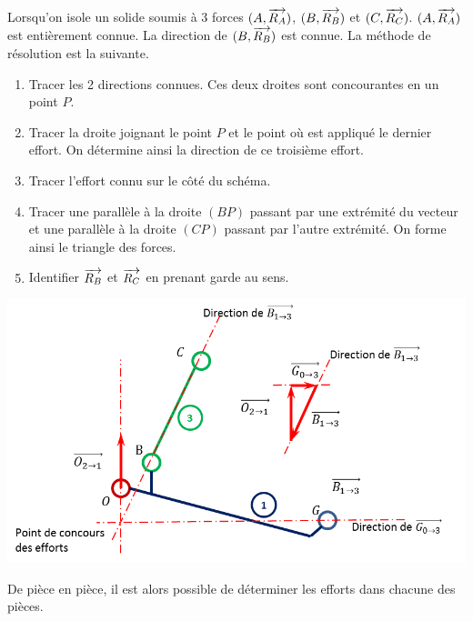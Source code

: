 \documentclass[10pt]{article}
\begin{document}
\begin{methode}
Lorsqu'on isole un solide soumis à 3 forces $(A,\overrightarrow{R_A})$, $(B,\overrightarrow{R_B})$ et $(C,\overrightarrow{R_C})$. $(A,\overrightarrow{R_A})$ est entièrement connue. La direction de $(B,\overrightarrow{R_B})$ est connue. La méthode de résolution est la suivante.
\begin{enumerate}
\item Tracer les 2 directions connues. Ces deux droites sont concourantes en un point $P$. 
\item Tracer la droite joignant le point $P$ et le point où est appliqué le dernier effort. On détermine ainsi la direction de ce troisième effort. 
\item Tracer l'effort connu sur le côté du schéma. 
\item Tracer une parallèle à la droite $(BP)$ passant par une extrémité du vecteur et une parallèle à la droite $(CP)$  passant par l'autre extrémité. On forme ainsi le triangle des forces. 
\item Identifier $\overrightarrow{R_B}$ et $\overrightarrow{R_C}$ en prenant garde au sens. 
\end{enumerate}
\end{methode}

\begin{exemple}
\begin{center}
\includegraphics[width=.75\textwidth]{images/1_F2}
\end{center}

De pièce en pièce, il est alors possible de déterminer les efforts dans chacune des pièces. 
\end{exemple}
\end{document}
